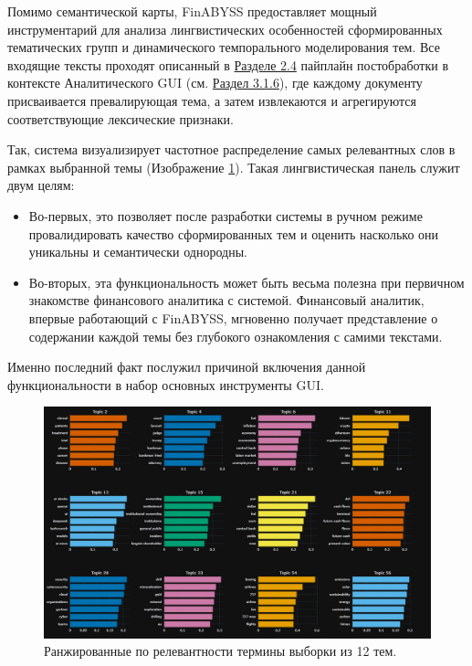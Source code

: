 Помимо семантической карты, FinABYSS предоставляет мощный инструментарий для анализа лингвистических
особенностей сформированных тематических групп и динамического темпорального моделирования тем.
Все входящие тексты проходят описанный в \hyperref[sec:sys_dev]{Разделе 2.4} пайплайн постобработки в контексте Аналитического
GUI (см. \hyperref[sec:sys_dev]{Раздел 3.1.6}), где каждому документу присваивается превалирующая тема,
а затем извлекаются и агрегируются соответствующие лексические признаки.

Так, система визуализирует частотное распределение самых релевантных слов в рамках выбранной темы
(Изображение \ref{fig:topics_words_freqs}). Такая лингвистическая панель служит двум целям:

\begin{itemize}
    \item Во-первых, это позволяет после разработки системы в ручном режиме провалидировать качество сформированных
    тем и оценить насколько они уникальны и семантически однородны.
    \item Во-вторых, эта функциональность может быть весьма полезна при первичном знакомстве финансового аналитика
    с системой. Финансовый аналитик, впервые работающий с FinABYSS, мгновенно получает представление о содержании каждой темы без глубокого ознакомления с самими текстами.
\end{itemize}

Именно последний факт послужил причиной включения данной функциональности в набор основных инструменты GUI.

\begin{figure}[H]
    \centering
    \includegraphics[width=1\linewidth]{img/topics_words_freqs.png}
    \caption{Ранжированные по релевантности термины выборки из 12 тем.}
    \label{fig:topics_words_freqs}
\end{figure}

